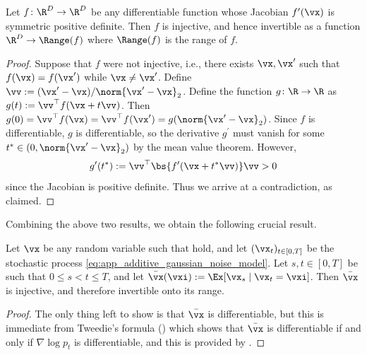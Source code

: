 \documentclass[../../book-main.tex]{subfiles}
\begin{document}
\begin{lemma}\label{lem:gribonval_A2}
    Let \(f \colon \R^{D} \to \R^{D}\) be any differentiable function whose Jacobian \(f^{\prime}(\vx)\) is symmetric positive definite. Then \(f\) is injective, and hence invertible as a function \(\R^{D} \to \Range(f)\) where \(\Range(f)\) is the range of \(f\).
\end{lemma}
\begin{proof}
    Suppose that \(f\) were not injective, i.e., there exists \(\vx, \vx^{\prime}\) such that \(f(\vx) = f(\vx^{\prime})\) while \(\vx \neq \vx^{\prime}\). Define \(\vv := (\vx^{\prime} - \vx)/\norm{\vx^{\prime} - \vx}_{2}\). Define the function \(g \colon \R \to \R\) as \(g(t) := \vv^{\top}f(\vx + t\vv)\). Then \(g(0) = \vv^{\top}f(\vx) = \vv^{\top}f(\vx^{\prime}) = g(\norm{\vx^{\prime} - \vx}_{2})\). Since \(f\) is differentiable, \(g\) is differentiable, so the derivative  \(g^{\prime}\) must vanish for some \(t^{\ast} \in (0, \norm{\vx^{\prime} - \vx}_{2})\) by the mean value theorem. However,
    \begin{equation}
        g^{\prime}(t^{\ast}) := \vv^{\top}\bs{f^{\prime}(\vx + t^{\ast}\vv)}\vv > 0
    \end{equation}
    since the Jacobian is positive definite. Thus we arrive at a contradiction, as claimed.
\end{proof}

Combining the above two results, we obtain the following crucial result.

\begin{corollary}\label{cor:gribonval_A2}
    Let \(\vx\) be any random variable such that  hold, and let \((\vx_{t})_{t \in [0, T]}\) be the stochastic process \eqref{eq:app_additive_gaussian_noise_model}. Let \(s, t \in [0, T]\) be such that \(0 \leq s < t \leq T\), and let \(\bar{\vx}(\vxi) := \Ex[\vx_{s} \mid \vx_{t} = \vxi]\). Then \(\bar{\vx}\) is injective, and therefore invertible onto its range.
\end{corollary}
\begin{proof}
    The only thing left to show is that \(\bar{\vx}\) is differentiable,  but this is immediate from Tweedie's formula () which shows that \(\bar{\vx}\) is differentiable if and only if \(\nabla \log p_{t}\) is differentiable, and this is provided by .
\end{proof}
\end{document}
